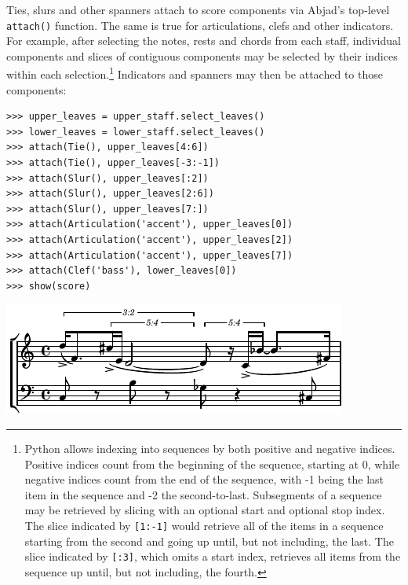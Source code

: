 \documentclass{article}
\begin{document}
Ties, slurs and other spanners attach to score components via Abjad's
top-level \texttt{attach()} function. The same is true for articulations, clefs
and other indicators. For example, after selecting the notes, rests and chords from each staff,
individual components and slices of contiguous components may be selected by
their indices within each selection.\footnote{Python allows indexing into
sequences by both positive and negative indices. Positive indices count from
the beginning of the sequence, starting at 0, while negative indices count from
the end of the sequence, with -1 being the last item in the sequence and -2 the
second-to-last. Subsegments of a sequence may be retrieved by slicing
with an optional start and optional stop index. The slice indicated by
\texttt{[1:-1]} would retrieve all of the items in a sequence starting from the
second and going up until, but not including, the last. The slice indicated by
\texttt{[:3]}, which omits a start index, retrieves all items from the sequence
up until, but not including, the fourth.} Indicators and spanners may then be
attached to those components:

\begin{lstlisting}
>>> upper_leaves = upper_staff.select_leaves()
>>> lower_leaves = lower_staff.select_leaves()
>>> attach(Tie(), upper_leaves[4:6])
>>> attach(Tie(), upper_leaves[-3:-1])
>>> attach(Slur(), upper_leaves[:2])
>>> attach(Slur(), upper_leaves[2:6])
>>> attach(Slur(), upper_leaves[7:])
>>> attach(Articulation('accent'), upper_leaves[0])
>>> attach(Articulation('accent'), upper_leaves[2])
>>> attach(Articulation('accent'), upper_leaves[7])
>>> attach(Clef('bass'), lower_leaves[0])
>>> show(score)
\end{lstlisting}
\noindent\includegraphics{assets/lilypond-b8f044cb7178ea31797238c629d3f54c.pdf}
\end{document}
